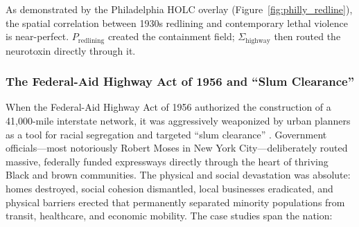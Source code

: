 \documentclass[12pt,openany]{book}
\begin{document}
As demonstrated by the Philadelphia HOLC overlay (Figure~\ref{fig:philly_redline}), the spatial correlation between 1930s redlining and contemporary lethal violence is near-perfect. $P_{\text{redlining}}$ created the containment field; $\Sigma_{\text{highway}}$ then routed the neurotoxin directly through it.

\subsubsection{The Federal-Aid Highway Act of 1956 and ``Slum Clearance''}

When the Federal-Aid Highway Act of 1956 authorized the construction of a 41,000-mile interstate network, it was aggressively weaponized by urban planners as a tool for racial segregation and targeted ``slum clearance'' \cite{tel_highway_act}. Government officials---most notoriously Robert Moses in New York City---deliberately routed massive, federally funded expressways directly through the heart of thriving Black and brown communities. The physical and social devastation was absolute: homes destroyed, social cohesion dismantled, local businesses eradicated, and physical barriers erected that permanently separated minority populations from transit, healthcare, and economic mobility. The case studies span the nation:
\end{document}
